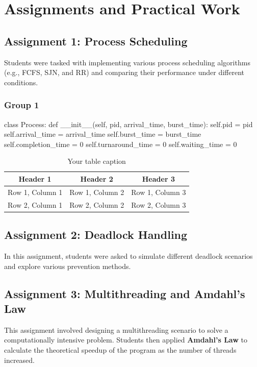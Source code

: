 \documentclass[12pt]{article}
\begin{document}
\section{Assignments and Practical Work}
\subsection{Assignment 1: Process Scheduling}
Students were tasked with implementing various process scheduling algorithms (e.g., FCFS, SJN, and RR) and comparing their performance under different conditions.
\subsubsection{Group 1}
\begin{python}
    class Process:
    def __init__(self, pid, arrival_time, burst_time):
        self.pid = pid
        self.arrival_time = arrival_time
        self.burst_time = burst_time
        self.completion_time = 0
        self.turnaround_time = 0
        self.waiting_time = 0
\end{python}

\begin{table}[htbp] %
    \centering
    \begin{tabular}{|c|c|c|} %
    \hline
    Header 1 & Header 2 & Header 3 \\ %
    \hline
    Row 1, Column 1 & Row 1, Column 2 & Row 1, Column 3 \\ %
    \hline
    Row 2, Column 1 & Row 2, Column 2 & Row 2, Column 3 \\ %
    \hline
    \end{tabular}
    \caption{Your table caption} %
    \label{tab:your_label} %
\end{table}
\subsection{Assignment 2: Deadlock Handling}
In this assignment, students were asked to simulate different deadlock scenarios and explore various prevention methods.

\subsection{Assignment 3: Multithreading and Amdahl's Law}
This assignment involved designing a multithreading scenario to solve a computationally intensive problem. Students then applied \textbf{Amdahl's Law} to calculate the theoretical speedup of the program as the number of threads increased.
\end{document}
